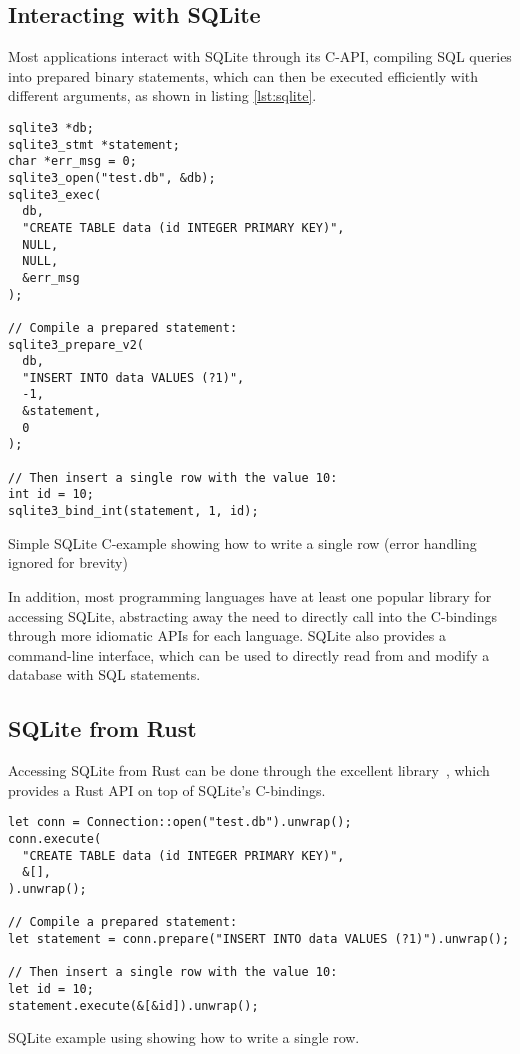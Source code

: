 \subsection{Interacting with SQLite}
Most applications interact with SQLite through its C-API, compiling SQL
queries into prepared binary statements, which can then be executed efficiently
with different arguments, as shown in listing \ref{lst:sqlite}.

\begin{listing}[H]
  \begin{verbatim}
sqlite3 *db;
sqlite3_stmt *statement;
char *err_msg = 0;
sqlite3_open("test.db", &db);
sqlite3_exec(
  db,
  "CREATE TABLE data (id INTEGER PRIMARY KEY)",
  NULL,
  NULL,
  &err_msg
);

// Compile a prepared statement:
sqlite3_prepare_v2(
  db,
  "INSERT INTO data VALUES (?1)",
  -1,
  &statement,
  0
);

// Then insert a single row with the value 10:
int id = 10;
sqlite3_bind_int(statement, 1, id);
  \end{verbatim}

  \caption{Simple SQLite C-example showing how to write a single row (error
  handling ignored for brevity)}\label{lst:sqlite}
\end{listing}

In addition, most programming languages have at least one popular library for
accessing SQLite, abstracting away the need to directly call into the C-bindings
through more idiomatic APIs for each language. SQLite also provides a
command-line interface, which can be used to directly read from and modify a
database with SQL statements.

\subsection{SQLite from Rust}
Accessing SQLite from Rust can be done through the excellent 
library~\cite{rusqlite}, which
provides a Rust API on top of SQLite's C-bindings.

\begin{listing}[H]
  \begin{verbatim}
let conn = Connection::open("test.db").unwrap();
conn.execute(
  "CREATE TABLE data (id INTEGER PRIMARY KEY)",
  &[],
).unwrap();

// Compile a prepared statement:
let statement = conn.prepare("INSERT INTO data VALUES (?1)").unwrap();

// Then insert a single row with the value 10:
let id = 10;
statement.execute(&[&id]).unwrap();

  \end{verbatim}

  \caption{SQLite example using  showing how to write a single
  row.}\label{lst:sqlite-rust}
\end{listing}

